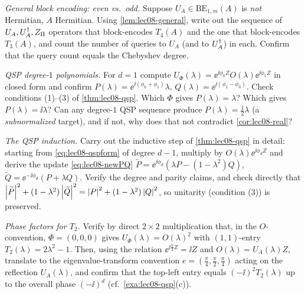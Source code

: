 \begin{exercise}\label{ex:lec08-4}
\emph{General block encoding: even vs.\ odd.} Suppose $U_A\in\mathrm{BE}_{1,m}(A)$ is
\emph{not} Hermitian, $A$ Hermitian. Using \cref{lem:lec08-general}, write out the
sequence of $U_A,U_A^{\dagger},Z_\Pi$ operators that block-encodes $T_4(A)$ and the one that
block-encodes $T_3(A)$, and count the number of queries to $U_A$ (and to $U_A^{\dagger}$) in
each. Confirm that the query count equals the Chebyshev degree.
\end{exercise}

\begin{exercise}\label{ex:lec08-5}
\emph{QSP degree-$1$ polynomials.} For $d=1$ compute $U_\Phi(\lambda)=
\ee^{\ii\phi_0 Z}O(\lambda)\ee^{\ii\phi_1 Z}$ in closed form and confirm
$P(\lambda)=\ee^{\ii(\phi_0+\phi_1)}\lambda$, $Q(\lambda)=\ee^{\ii(\phi_1-\phi_0)}$.
Check conditions (1)--(3) of \cref{thm:lec08-qsp}. Which $\Phi$ gives
$P(\lambda)=\lambda$? Which gives $P(\lambda)=\ii\lambda$? Can any degree-$1$ QSP
sequence produce $P(\lambda)=\tfrac12\lambda$ (a \emph{subnormalized} target), and if
not, why does that not contradict \cref{cor:lec08-real}?
\end{exercise}

\begin{exercise}\label{ex:lec08-6}
\emph{The QSP induction.} Carry out the inductive step of \cref{thm:lec08-qsp} in
detail: starting from \eqref{eq:lec08-qspform} of degree $d-1$, multiply by
$O(\lambda)\ee^{\ii\phi_d Z}$ and derive the update \eqref{eq:lec08-newPQ}
$\widetilde P=\ee^{\ii\phi_d}(\lambda P-(1-\lambda^2)Q)$,
$\widetilde Q=\ee^{-\ii\phi_d}(P+\lambda Q)$. Verify the degree and parity claims,
and check directly that $\left\lvert \widetilde P \right\rvert^2+(1-\lambda^2)\left\lvert \widetilde Q \right\rvert^2=
\left\lvert P \right\rvert^2+(1-\lambda^2)\left\lvert Q \right\rvert^2$, so unitarity (condition (3)) is preserved.
\end{exercise}

\begin{exercise}\label{ex:lec08-7}
\emph{Phase factors for $T_2$.} Verify by direct $2\times2$ multiplication that, in
the $O$-convention, $\Phi=(0,0,0)$ gives $U_\Phi(\lambda)=O(\lambda)^2$ with
$(1,1)$-entry $T_2(\lambda)=2\lambda^2-1$. Then, using the relation
$\ee^{\ii\frac\pi2 Z}=\ii Z$ and $O(\lambda)=U_A(\lambda)Z$, translate to the
eigenvalue-transform convention $e=(\tfrac\pi4,\tfrac\pi2,\tfrac\pi4)$ acting on the
reflection $U_A(\lambda)$, and confirm that the top-left entry equals
$(-\ii)^2 T_2(\lambda)$ up to the overall phase $(-\ii)^d$ (cf.\
\cref{exa:lec08-qsp}(c)).
\end{exercise}

